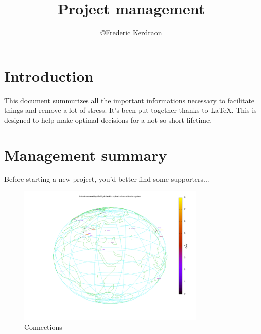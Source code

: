 \documentclass[8pt]{article} %
\title{Project management}
\author{\copyright Frederic Kerdraon}
\begin{document}
\maketitle
\tableofcontents

\section{Introduction}

This document summurizes all the important informations necessary to facilitate things and remove a lot of stress. It's been put together thanks to \LaTeX. This is designed to help make optimal decisions for a not so short lifetime.

%


\newcommand{\slice}[4]{
  \pgfmathparse{0.5*#1+0.5*#2}
  \let\midangle\pgfmathresult

   slice
  \draw[thick,fill=black!10] (0,0) -- (#1:1) arc (#1:#2:1) -- cycle;

   outer label
  \node[label=\midangle:#4] at (\midangle:1) {};

   inner label
  \pgfmathparse{min((#2-#1-10)/110*(-0.3),0)}
  \let\temp\pgfmathresult
  \pgfmathparse{max(\temp,-0.5) + 0.8}
  \let\innerpos\pgfmathresult
  \node at (\midangle:\innerpos) {#3};
}

\section{Management summary}

Before starting a new project, you'd better find some supporters...
\begin{figure}[ht!]
\centering
\includegraphics[width=90mm]{World3.png}
\caption{Connections \label{overflow}}
\end{figure}
\end{document}
